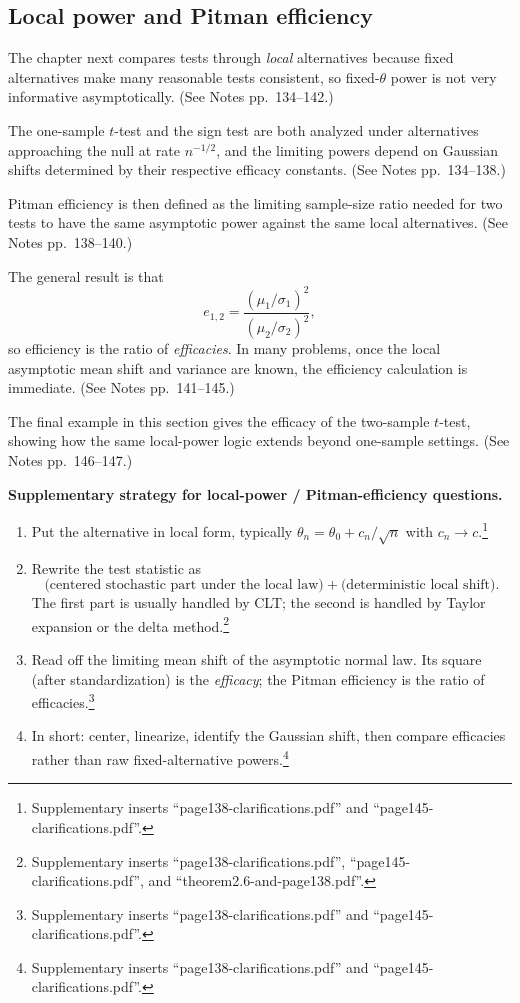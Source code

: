 \subsection{Local power and Pitman efficiency}
The chapter next compares tests through \emph{local} alternatives because fixed alternatives make many reasonable tests consistent, so fixed-$\theta$ power is not very informative asymptotically. (See Notes pp.~134--142.)

The one-sample $t$-test and the sign test are both analyzed under alternatives approaching the null at rate $n^{-1/2}$, and the limiting powers depend on Gaussian shifts determined by their respective efficacy constants. (See Notes pp.~134--138.)

Pitman efficiency is then defined as the limiting sample-size ratio needed for two tests to have the same asymptotic power against the same local alternatives. (See Notes pp.~138--140.)

The general result is that
\[
e_{1,2} = \frac{(\mu_1/\sigma_1)^2}{(\mu_2/\sigma_2)^2},
\]
so efficiency is the ratio of \emph{efficacies}. In many problems, once the local asymptotic mean shift and variance are known, the efficiency calculation is immediate. (See Notes pp.~141--145.)

The final example in this section gives the efficacy of the two-sample $t$-test, showing how the same local-power logic extends beyond one-sample settings. (See Notes pp.~146--147.)

\begin{mybox}
\textbf{Supplementary strategy for local-power / Pitman-efficiency questions.}
\begin{enumerate}
    \item Put the alternative in local form, typically $\theta_n = \theta_0 + c_n/\sqrt{n}$ with $c_n \to c$.\footnote{Supplementary inserts ``page138-clarifications.pdf'' and ``page145-clarifications.pdf''.}
    \item Rewrite the test statistic as
    \[
    \text{(centered stochastic part under the local law)} + \text{(deterministic local shift)}.
    \]
    The first part is usually handled by CLT; the second is handled by Taylor expansion or the delta method.\footnote{Supplementary inserts ``page138-clarifications.pdf'', ``page145-clarifications.pdf'', and ``theorem2.6-and-page138.pdf''.}
    \item Read off the limiting mean shift of the asymptotic normal law. Its square (after standardization) is the \emph{efficacy}; the Pitman efficiency is the ratio of efficacies.\footnote{Supplementary inserts ``page138-clarifications.pdf'' and ``page145-clarifications.pdf''.}
    \item In short: center, linearize, identify the Gaussian shift, then compare efficacies rather than raw fixed-alternative powers.\footnote{Supplementary inserts ``page138-clarifications.pdf'' and ``page145-clarifications.pdf''.}
\end{enumerate}
\end{mybox}

